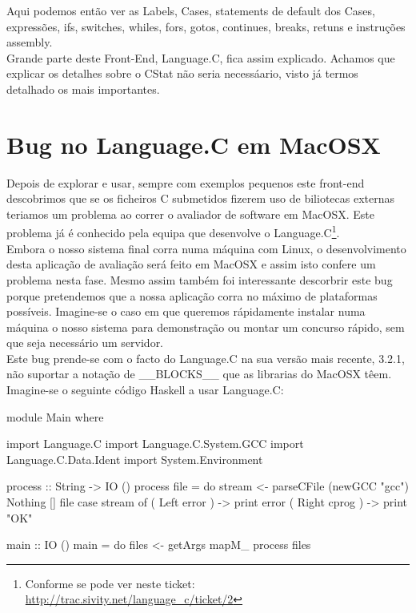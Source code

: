 Aqui podemos então ver as Labels, Cases, statements de default dos Cases, expressões, ifs, switches,
whiles, fors, gotos, continues, breaks, retuns e instruções assembly.\\

Grande parte deste Front-End, Language.C, fica assim explicado. Achamos que explicar os detalhes
sobre o \textrm{CStat} não seria necessáario, visto já termos detalhado os mais importantes.

\section{Bug no \textrm{Language.C} em \textrm{MacOSX}}
Depois de explorar e usar, sempre com exemplos pequenos este front-end descobrimos que se os ficheiros C submetidos fizerem uso de biliotecas externas teriamos um
problema ao correr o avaliador de software em MacOSX. Este problema já é conhecido pela equipa que desenvolve o Language.C\footnote{Conforme se pode ver neste ticket: \url{http://trac.sivity.net/language_c/ticket/2}}.\\
Embora o nosso sistema final corra numa máquina com Linux, o desenvolvimento desta aplicação de avaliação será feito em MacOSX e assim isto confere um problema nesta fase.
Mesmo assim também foi interessante descorbrir este bug porque pretendemos que a nossa aplicação corra no máximo de plataformas possíveis. Imagine-se o caso em que
queremos rápidamente instalar numa máquina o nosso sistema para demonstração ou montar um concurso rápido, sem que seja necessário um servidor.\\

Este bug prende-se com o facto do Language.C na sua versão mais recente, 3.2.1, não suportar a notação de \_\_BLOCKS\_\_ que as librarias do MacOSX têem.\\
Imagine-se o seguinte código Haskell a usar Language.C:

\begin{haskell}
module Main where

import Language.C
import Language.C.System.GCC
import Language.C.Data.Ident
import System.Environment

process :: String -> IO ()
process file = do
	stream <- parseCFile (newGCC "gcc") Nothing [] file
	case stream of
		( Left error  ) -> print error
		( Right cprog ) -> print "OK"

main :: IO ()
main = do
	files <- getArgs
	mapM_ process files
\end{haskell}

